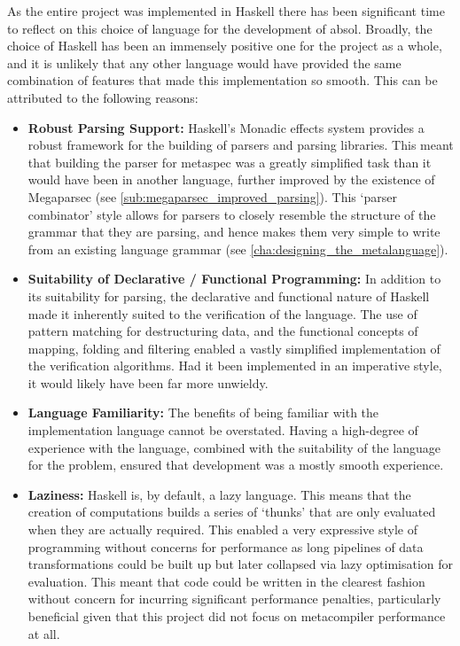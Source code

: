 As the entire project was implemented in Haskell there has been significant time to reflect on this choice of language for the development of \gls{absol}.
Broadly, the choice of Haskell has been an immensely positive one for the project as a whole, and it is unlikely that any other language would have provided the same combination of features that made this implementation so smooth.
This can be attributed to the following reasons:
\begin{itemize}
    \item \textbf{Robust Parsing Support:} Haskell's Monadic effects system provides a robust framework for the building of parsers and parsing libraries. 
    This meant that building the parser for \gls{metaspec} was a greatly simplified task than it would have been in another language, further improved by the existence of Megaparsec (see \autoref{sub:megaparsec_improved_parsing}). 
    This `parser combinator' style allows for parsers to closely resemble the structure of the grammar that they are parsing, and hence makes them very simple to write from an existing language grammar (see \autoref{cha:designing_the_metalanguage}).
    \item \textbf{Suitability of Declarative / Functional Programming:} In addition to its suitability for parsing, the declarative and functional nature of Haskell made it inherently suited to the verification of the language.
    The use of pattern matching for destructuring data, and the functional concepts of mapping, folding and filtering enabled a vastly simplified implementation of the verification algorithms.
    Had it been implemented in an imperative style, it would likely have been far more unwieldy. 
    \item \textbf{Language Familiarity:} The benefits of being familiar with the implementation language cannot be overstated. 
    Having a high-degree of experience with the language, combined with the suitability of the language for the problem, ensured that development was a mostly smooth experience. 
    \item \textbf{Laziness:} Haskell is, by default, a lazy language.
    This means that the creation of computations builds a series of `thunks' that are only evaluated when they are actually required.
    This enabled a very expressive style of programming without concerns for performance as long pipelines of data transformations could be built up but later collapsed via lazy optimisation for evaluation.
    This meant that code could be written in the clearest fashion without concern for incurring significant performance penalties, particularly beneficial given that this project did not focus on metacompiler performance at all.
\end{itemize}

